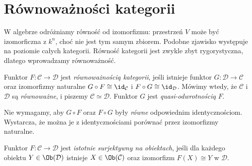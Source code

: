 \section{Równoważności kategorii}\label{sec:equivalence}

W algebrze odróżniamy równość od izomorfizmu: przestrzeń $V$ może być izomorficzna z $k^n$, choć nie jest tym samym zbiorem. Podobne zjawisko występuje na poziomie całych kategorii. Równość kategorii jest zwykle zbyt rygorystyczna, dlatego wprowadzamy równoważność.

\begin{definicja}\label{def:equivalence}
Funktor $F:\mathcal C\to\mathcal D$ jest \emph{równoważnością kategorii}, jeśli istnieje funktor $G:\mathcal D\to\mathcal C$ oraz izomorfizmy naturalne $G\circ F\cong\id_{\mathcal C}$ i $F\circ G\cong\id_{\mathcal D}$. Mówimy wtedy, że $\mathcal C$ i $\mathcal D$ są \emph{równoważne}, i piszemy $\mathcal C\simeq\mathcal D$. Funktor $G$ jest \emph{quasi-odwrotnością} $F$.
\end{definicja}

Nie wymagamy, aby $G\circ F$ oraz $F\circ G$ były \emph{równe} odpowiednim identycznościom. Wystarcza, że można je z identycznościami porównać przez izomorfizmy naturalne.

\begin{definicja}
Funktor $F:\mathcal C\to\mathcal D$ jest \emph{istotnie surjektywny na obiektach}, jeśli dla każdego obiektu $Y\in\Ob(\mathcal D)$ istnieje $X\in\Ob(\mathcal C)$ oraz izomorfizm $F(X)\cong Y$ w $\mathcal D$.
\end{definicja}

